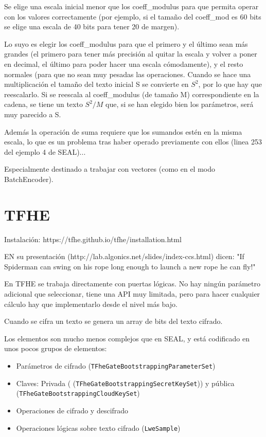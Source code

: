 Se elige una escala inicial menor que los coeff\_modulus para que permita operar con los valores correctamente (por ejemplo, si el tamaño del coeff\_mod es 60 bits se elige una escala de 40 bits para tener 20 de margen).

Lo suyo es elegir los coeff\_modulus para que el primero y el último sean más grandes (el primero para tener más precisión al quitar la escala y volver a poner en decimal, el último para poder hacer una escala cómodamente), y el resto normales (para que no sean muy pesadas las operaciones. Cuando se hace una multiplicación el tamaño del texto inicial S se convierte en $S^2$, por lo que hay que reescalarlo. Si se reescala al coeff\_modulus (de tamaño M) correspondiente en la cadena, se tiene un texto $S^2/M$ que, si se han elegido bien los parámetros, será muy parecido a S.

Además la operación de suma requiere que los sumandos estén en la misma escala, lo que es un problema tras haber operado previamente con ellos (linea 253 del ejemplo 4 de SEAL)...

Especialmente destinado a trabajar con vectores (como en el modo BatchEncoder).

\section{TFHE}


Instalación: https://tfhe.github.io/tfhe/installation.html

EN su presentación (http://lab.algonics.net/slides/index-ccs.html) dicen: "If Spiderman can swing on his rope long enough to launch a new rope he can fly!"

En TFHE se trabaja directamente con puertas lógicas. No hay ningún parámetro adicional que seleccionar, tiene una API muy limitada, pero para hacer cualquier cálculo hay que implementarlo desde el nivel más bajo.

Cuando se cifra un texto se genera un array de bits del texto cifrado.

Los elementos son mucho menos complejos que en SEAL, y está codificado en unos pocos grupos de elementos:

\begin{itemize}
  \item Parámetros de cifrado (\texttt{TFheGateBootstrappingParameterSet})
  \item Claves: Privada ( (\texttt{TFheGateBootstrappingSecretKeySet})) y pública (\texttt{TFheGateBootstrappingCloudKeySet})
  \item Operaciones de cifrado y descifrado
  \item Operaciones lógicas sobre texto cifrado (\texttt{LweSample})
\end{itemize}


